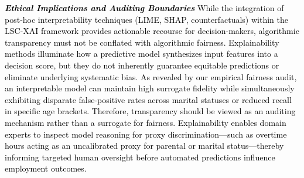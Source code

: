 \documentclass[a4paper,fleqn]{cas-sc}
\begin{document}
{\textcolor{black}{\textit{\textbf{Ethical Implications and Auditing Boundaries}}
While the integration of post-hoc interpretability techniques (LIME, SHAP, counterfactuals) within the LSC-XAI framework provides actionable recourse for decision-makers, algorithmic transparency must not be conflated with algorithmic fairness. Explainability methods illuminate how a predictive model synthesizes input features into a decision score, but they do not inherently guarantee equitable predictions or eliminate underlying systematic bias.
As revealed by our empirical fairness audit, an interpretable model can maintain high surrogate fidelity while simultaneously exhibiting disparate false-positive rates across marital statuses or reduced recall in specific age brackets. Therefore, transparency should be viewed as an auditing mechanism rather than a surrogate for fairness. Explainability enables domain experts to inspect model reasoning for proxy discrimination—such as overtime hours acting as an uncalibrated proxy for parental or marital status—thereby informing targeted human oversight before automated predictions influence employment outcomes.}

}
\end{document}

